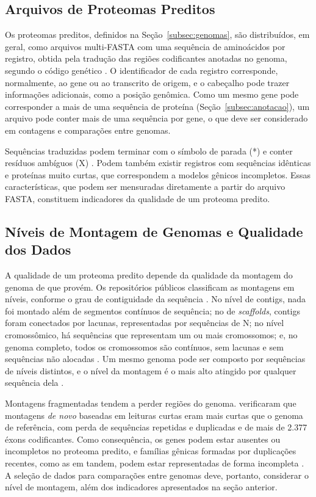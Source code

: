 \subsection{Arquivos de Proteomas Preditos}

Os proteomas preditos, definidos na Seção~\ref{subsec:genomas}, são distribuídos, em geral, como arquivos multi-FASTA com uma sequência de aminoácidos por registro, obtida pela tradução das regiões codificantes anotadas no genoma, segundo o código genético \cite{Denoeud2014, Scalabrin2020}. O identificador de cada registro corresponde, normalmente, ao gene ou ao transcrito de origem, e o cabeçalho pode trazer informações adicionais, como a posição genômica. Como um mesmo gene pode corresponder a mais de uma sequência de proteína (Seção~\ref{subsec:anotacao}), um arquivo pode conter mais de uma sequência por gene, o que deve ser considerado em contagens e comparações entre genomas.

Sequências traduzidas podem terminar com o símbolo de parada (*) e conter resíduos ambíguos (X) \cite{NCBIBlast}. Podem também existir registros com sequências idênticas e proteínas muito curtas, que correspondem a modelos gênicos incompletos. Essas características, que podem ser mensuradas diretamente a partir do arquivo FASTA, constituem indicadores da qualidade de um proteoma predito.

\subsection{Níveis de Montagem de Genomas e Qualidade dos Dados}
\label{sec:montagem}

A qualidade de um proteoma predito depende da qualidade da montagem do genoma de que provém. Os repositórios públicos classificam as montagens em níveis, conforme o grau de contiguidade da sequência \cite{NCBIAssembly}. No nível de contigs, nada foi montado além de segmentos contínuos de sequência; no de \textit{scaffolds}, contigs foram conectados por lacunas, representadas por sequências de N; no nível cromossômico, há sequências que representam um ou mais cromossomos; e, no genoma completo, todos os cromossomos são contínuos, sem lacunas e sem sequências não alocadas \cite{NCBIAssembly}. Um mesmo genoma pode ser composto por sequências de níveis distintos, e o nível da montagem é o mais alto atingido por qualquer sequência dela \cite{NCBIAssembly}.

Montagens fragmentadas tendem a perder regiões do genoma.  verificaram que montagens \textit{de novo} baseadas em leituras curtas eram mais curtas que o genoma de referência, com perda de sequências repetidas e duplicadas e de mais de 2.377 éxons codificantes. Como consequência, os genes podem estar ausentes ou incompletos no proteoma predito, e famílias gênicas formadas por duplicações recentes, como as em tandem, podem estar representadas de forma incompleta \cite{Alkan2011}. A seleção de dados para comparações entre genomas deve, portanto, considerar o nível de montagem, além dos indicadores apresentados na seção anterior.

